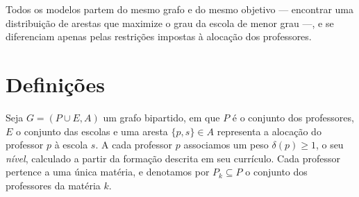 \documentclass[12pt,a4paper]{article}
\begin{document}
Todos os modelos partem do mesmo grafo e do mesmo objetivo --- encontrar uma
distribuição de arestas que maximize o grau da escola de menor grau ---, e se
diferenciam apenas pelas restrições impostas à alocação dos professores.

\section{Definições}

Seja $G = (P \cup E, A)$ um grafo bipartido, em que $P$ é o conjunto dos
professores, $E$ o conjunto das escolas e uma aresta $\{p, s\} \in A$
representa a alocação do professor $p$ à escola $s$. A cada professor $p$
associamos um peso $\delta(p) \ge 1$, o seu \emph{nível}, calculado a partir
da formação descrita em seu currículo. Cada professor pertence a uma única
matéria, e denotamos por $P_k \subseteq P$ o conjunto dos professores da
matéria $k$.
\end{document}
